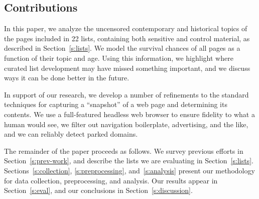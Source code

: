 \subsection{Contributions}

In this paper, we analyze the uncensored contemporary and historical
topics of the pages included in 22 lists, containing both sensitive
and control material, as described in Section~\ref{s:lists}.  We model
the survival chances of all pages as a function of their topic and
age.  Using this information, we highlight where curated list
development may have missed something important, and we discuss ways
it can be done better in the future.

In support of our research, we develop a number of refinements to the
standard techniques for capturing a “snapshot” of a web page and
determining its contents. We use a full-featured headless web browser
to ensure fidelity to what a human would see, we filter out navigation
boilerplate, advertising, and the like, and we can reliably detect
parked domains.

The remainder of the paper proceeds as follows. We survey previous
efforts in Section~\ref{s:prev-work}, and describe the lists we are
evaluating in Section~\ref{s:lists}.  Sections~\ref{s:collection},
\ref{s:preprocessing}, and~\ref{s:analysis} present our methodology
for data collection, preprocessing, and analysis.  Our results appear
in Section~\ref{s:eval}, and our conclusions in Section~\ref{s:discussion}.
